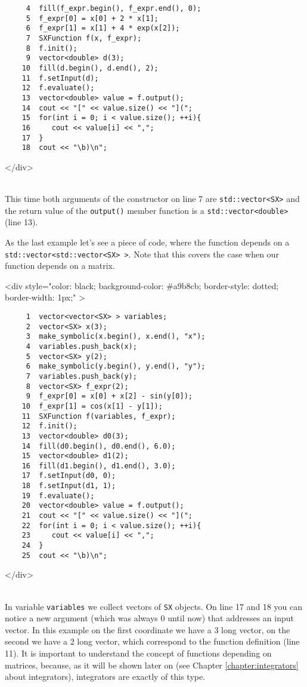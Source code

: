 \documentclass[a4paper,12pt]{book}
\newcommand{\codebegin}{
\begin{rawhtml}
<div style="color: black; background-color: \#a9b8cb;  border-style: dotted; border-width: 1px;" >
\end{rawhtml}
}
\newcommand{\codeend}{
\begin{rawhtml}
</div>
\end{rawhtml}
}
\begin{document}
{\begin{verbatim}
     4  fill(f_expr.begin(), f_expr.end(), 0);
     5  f_expr[0] = x[0] + 2 * x[1];
     6  f_expr[1] = x[1] + 4 * exp(x[2]);
     7  SXFunction f(x, f_expr);
     8  f.init();
     9  vector<double> d(3);
    10  fill(d.begin(), d.end(), 2);
    11  f.setInput(d);
    12  f.evaluate();
    13  vector<double> value = f.output();
    14  cout << "[" << value.size() << "](";
    15  for(int i = 0; i < value.size(); ++i){
    16     cout << value[i] << ",";
    17  }
    18  cout << "\b)\n";
\end{verbatim}
\codeend\\
This time both arguments of the constructor on line 7 are \texttt{std::vector<SX>}
 and the return value of the
 \texttt{output()} member function is a \texttt{std::vector<double>} (line 13).
\par\noindent
As the last example let's see a piece of code, where the function depends on a  \texttt{std::vector<std::vector<SX> >}. 
Note that this covers the case when our function depends on a matrix.
\par
\codebegin
\begin{verbatim}
     1  vector<vector<SX> > variables;
     2  vector<SX> x(3);
     3  make_symbolic(x.begin(), x.end(), "x");
     4  variables.push_back(x);
     5  vector<SX> y(2);
     6  make_symbolic(y.begin(), y.end(), "y");
     7  variables.push_back(y);
     8  vector<SX> f_expr(2);
     9  f_expr[0] = x[0] + x[2] - sin(y[0]);
    10  f_expr[1] = cos(x[1] - y[1]);
    11  SXFunction f(variables, f_expr);
    12  f.init();
    13  vector<double> d0(3);
    14  fill(d0.begin(), d0.end(), 6.0);
    15  vector<double> d1(2);
    16  fill(d1.begin(), d1.end(), 3.0);
    17  f.setInput(d0, 0);
    18  f.setInput(d1, 1);
    19  f.evaluate();
    20  vector<double> value = f.output();
    21  cout << "[" << value.size() << "](";
    22  for(int i = 0; i < value.size(); ++i){
    23     cout << value[i] << ",";
    24  }
    25  cout << "\b)\n";
\end{verbatim}
\codeend\\
In variable \texttt{variables} we collect vectors of \texttt{SX} objects. On line 17 and 18 you can notice
a new argument (which was always 0 until now) that addresses an input vector. In this example on the first coordinate
we have a 3 long vector, on the second we have a 2 long vector, which correspond to the function definition (line 11).
It is important to understand the concept of functions depending on matrices, because, as it will be shown later on (see
Chapter \ref{chapter:integrators} about integrators),
integrators are exactly of this type.
}
\end{document}
